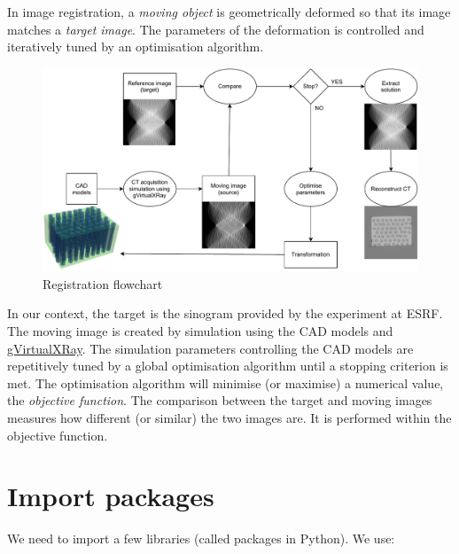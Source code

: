 \documentclass[11pt]{article}
\begin{document}
    In image registration, a \emph{moving object} is geometrically deformed
so that its image matches a \emph{target image}. The parameters of the
deformation is controlled and iteratively tuned by an optimisation
algorithm.

\begin{figure}
\centering
\includegraphics{../doc/registration.pdf}
\caption{Registration flowchart}
\end{figure}

In our context, the target is the sinogram provided by the experiment at
ESRF. The moving image is created by simulation using the CAD models and
\href{https://sourceforge.net/projects/gvirtualxray/}{gVirtualXRay}. The
simulation parameters controlling the CAD models are repetitively tuned
by a global optimisation algorithm until a stopping criterion is met.
The optimisation algorithm will minimise (or maximise) a numerical
value, the \emph{objective function}. The comparison between the target
and moving images measures how different (or similar) the two images
are. It is performed within the objective function.

    \hypertarget{import-packages}{%
\section{Import packages}\label{import-packages}}

We need to import a few libraries (called packages in Python). We use:
\end{document}

